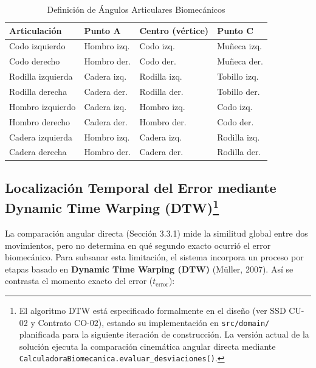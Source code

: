 \documentclass[12pt,letterpaper]{article}
\begin{document}
\begin{table}[htbp]
\centering
\small
\begin{tabularx}{\textwidth}{|>{\raggedright\arraybackslash}X|>{\raggedright\arraybackslash}X|>{\raggedright\arraybackslash}X|>{\raggedright\arraybackslash}X|}
    \hline
    \textbf{Articulación} & \textbf{Punto A} & \textbf{Centro (vértice)} & \textbf{Punto C} \\ \hline
    Codo izquierdo & Hombro izq. & Codo izq. & Muñeca izq. \\ \hline
    Codo derecho & Hombro der. & Codo der. & Muñeca der. \\ \hline
    Rodilla izquierda & Cadera izq. & Rodilla izq. & Tobillo izq. \\ \hline
    Rodilla derecha & Cadera der. & Rodilla der. & Tobillo der. \\ \hline
    Hombro izquierdo & Cadera izq. & Hombro izq. & Codo izq. \\ \hline
    Hombro derecho & Cadera der. & Hombro der. & Codo der. \\ \hline
    Cadera izquierda & Hombro izq. & Cadera izq. & Rodilla izq. \\ \hline
    Cadera derecha & Hombro der. & Cadera der. & Rodilla der. \\ \hline
\end{tabularx}
\caption{Definición de Ángulos Articulares Biomecánicos}
\label{tab:articulaciones}
\end{table}

\subsection[Localización Temporal del Error mediante Dynamic Time Warping (DTW)]{Localización Temporal del Error mediante Dynamic Time Warping (DTW)\footnote{El algoritmo DTW está especificado formalmente en el diseño (ver SSD CU-02 y Contrato CO-02), estando su implementación en \texttt{src/domain/} planificada para la siguiente iteración de construcción. La versión actual de la solución ejecuta la comparación cinemática angular directa mediante \texttt{CalculadoraBiomecanica.evaluar\_desviaciones()}.}}

La comparación angular directa (Sección 3.3.1) mide la similitud global entre dos movimientos, pero no determina en qué segundo exacto ocurrió el error biomecánico. Para subsanar esta limitación, el sistema incorpora un proceso por etapas basado en \textbf{Dynamic Time Warping (DTW)} (Müller, 2007). Así se contrasta el momento exacto del error ($t_{\text{error}}$):
\end{document}
